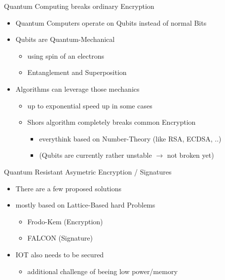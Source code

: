 \documentclass[ucs,10pt]{beamer}
\begin{document}
\begin{frame}{Quantum Computing breaks ordinary Encryption}
  \begin{itemize}
  \item
    Quantum Computers operate on Qubits instead of normal Bits
  \item
    Qubits are Quantum-Mechanical
    \begin{itemize}
      \item using spin of an electrons
      \item Entanglement and Superposition
    \end{itemize}
  \item
    Algorithms can leverage those mechanics
    \begin{itemize}
      \item up to exponential speed up in some cases
      \item Shors algorithm completely breaks common Encryption 
      \begin{itemize}
        \item everythink based on Number-Theory (like RSA, ECDSA, ..)
        \item (Qubits are currently rather unstable $\rightarrow$ not broken yet)
      \end{itemize}
    \end{itemize}
  \end{itemize}
\end{frame}

\begin{frame}{Quantum Resistant Asymetric Encryption / Signatures}

  \begin{itemize}
  \item There are a few proposed solutions
    
  \item mostly based on Lattice-Based hard Problems
    \begin{itemize}
    \item Frodo-Kem (Encryption)
    \item FALCON (Signature)
    \end{itemize}
   
  \item IOT also needs to be secured
  \begin{itemize}
    \item additional challenge of beeing low power/memory
    \end{itemize}
  \end{itemize}
\end{frame}
\end{document}
